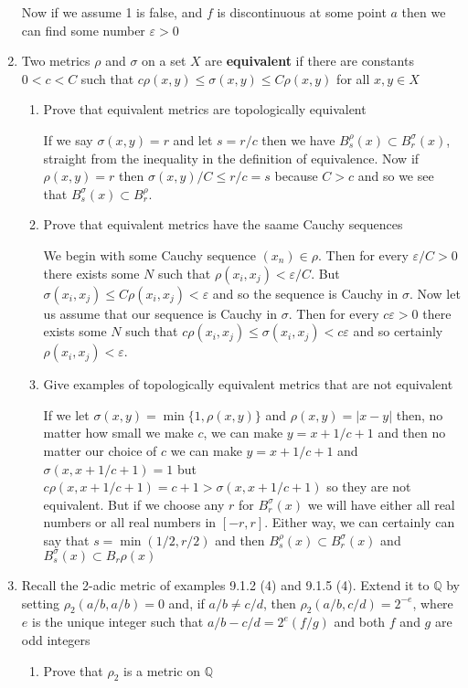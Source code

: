 \documentclass[letterpaper]{article}
\begin{document}
\begin{enumerate}
  Now if we assume 1 is false, and $f$ is discontinuous at some point $a$ then we can find some number $\varepsilon>0$
\renewcommand{\labelenumii}{(\alph{enumii})}
\setcounter{enumi}{7}
\item
Two metrics $\rho$ and $\sigma$ on a set $X$ are {\bf equivalent} if there are
constants $0<c<C$ such that $c\rho(x,y)\le\sigma(x,y)\le C\rho(x,y)$ for all
$x,y\in X$
  \begin{enumerate}
    \item
    Prove that equivalent metrics are topologically equivalent

    If we say $\sigma(x,y)=r$ and let $s=r/c$ then we have $B_s^\rho(x)\subset  B_r^\sigma(x)$, straight from the inequality in the definition of equivalence. Now if $\rho(x,y)=r$ then $\sigma(x,y)/C\le r/c=s$ because $C>c$ and so we see that $B_s^\sigma(x)\subset B_r^\rho$.
    \item
    Prove that equivalent metrics have the saame Cauchy sequences

    We begin with some Cauchy sequence $(x_n)\in \rho$.
    Then for every $\varepsilon/C>0$ there exists some $N$ such that $\rho(x_i,x_j)<\varepsilon/C$.
    But $\sigma(x_i,x_j)\le C\rho(x_i,x_j)<\varepsilon$ and so the sequence is Cauchy in $\sigma$.
    Now let us assume that our sequence is Cauchy in $\sigma$.
    Then for every $c\varepsilon>0$ there exists some $N$ such that $c\rho(x_i,x_j)\le \sigma(x_i,x_j)<c\varepsilon$ and so certainly $\rho(x_i,x_j)<\varepsilon$.
    \item
    Give examples of topologically equivalent metrics that are not equivalent

    If we let $\sigma(x,y)=\min\{1,\rho(x,y)\}$ and $\rho(x,y)=|x-y|$ then, no
    matter how small we make $c$, we can make $y=x+1/c+1$ and then no matter
    our choice of $c$ we can make $y=x+1/c+1$ and $\sigma(x,x+1/c+1)=1$ but $c\rho(x,x+1/c+1)=c+1>\sigma(x,x+1/c+1)$ so they are not equivalent. But if we choose any $r$ for $B_r^\sigma(x)$ we will have either all real numbers or all real numbers in $[-r,r]$. Either way, we can certainly can say that $s=\min(1/2,r/2)$ and then $B_s^\rho(x)\subset B_r^\sigma(x)$ and $B_s^\sigma(x)\subset B_r\rho(x)$
  \end{enumerate}
\setcounter{enumi}{10}
\item
Recall the 2-adic metric of examples 9.1.2 (4) and 9.1.5 (4). Extend it to
$\mathbb{Q}$ by setting $\rho_2(a/b,a/b)=0$ and, if $a/b\ne c/d$, then
$\rho_2(a/b,c/d)=2^{-e}$, where $e$ is the unique integer such that
$a/b-c/d=2^e(f/g)$ and both $f$ and $g$ are odd integers
  \begin{enumerate}
    \item
    Prove that $\rho_2$ is a metric on $\mathbb{Q}$


\end{enumerate}
\end{enumerate}
\end{document}
